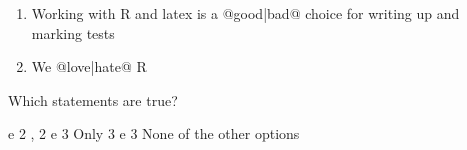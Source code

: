 \documentclass[10pt, answers]{exam}
\begin{document}
\begin{questions}
\begin{enumerate}
		\item Working with R and latex is a @{good}|{bad}@ choice for writing up and marking tests
		
		\item We @{love}|{hate}@ R
		
	\end{enumerate}
	
	Which statements are true?

	\begin{choices}
	 e 2
	, 2 e 3
	\choice Only 3
	 e 3
	\choice [2] None of the other options
	\end{choices}
	
\end{questions}
\end{document}
